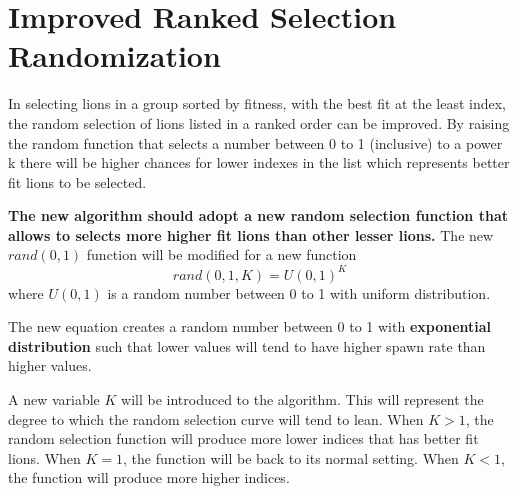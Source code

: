 \section{Improved Ranked Selection Randomization}

\par In selecting lions in a group sorted by fitness, with the best fit at the least index, the random selection of lions listed in a ranked order can be improved. By raising the random function that selects a number between 0 to 1 (inclusive) to a power k there will be higher chances for lower indexes in the list which represents better fit lions to be selected.

\par \textbf{The new algorithm should adopt a new random selection function that allows to selects more higher fit lions than other lesser lions.} The new $rand(0,1)$ function will be modified for a new function
$$
rand(0,1,K) = U(0,1)^K
$$
where $U(0,1)$ is a random number between 0 to 1 with uniform distribution.

\par The new equation creates a random number between 0 to 1 with \textbf{exponential distribution} such that lower values will tend to have higher spawn rate than higher values.

\par A new variable $K$ will be introduced to the algorithm. This will represent the degree to which the random selection curve will tend to lean. When $K > 1$, the random selection function will produce more lower indices that has better fit lions. When $K = 1$, the function will be back to its normal setting. When $K < 1$, the function will produce more higher indices.
